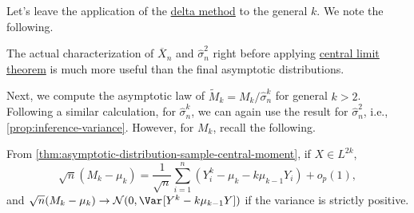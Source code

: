 Let's leave the application of the \hyperref[thm:delta-method]{delta method} to the general \(k\). We note the following.

\begin{note}
	The actual characterization of \(\overline{X} _n\) and \(\hat{\sigma} _n^2\) right before applying \hyperref[thm:CLT]{central limit theorem} is much more useful than the final asymptotic distributions.
\end{note}

Next, we compute the asymptotic law of \(\widetilde{M} _k = M_k / \hat{\sigma} _n^k\) for general \(k > 2\). Following a similar calculation, for \(\hat{\sigma} _n^k\), we can again use the result for \(\hat{\sigma} _n^2\), i.e., \autoref{prop:inference-variance}. However, for \(M_k\), recall the following.

\begin{prev}
	From \autoref{thm:asymptotic-distribution-sample-central-moment}, if \(X \in L^{2k}\),
	\[
		\sqrt{n} (M_k - \mu _k)
		= \frac{1}{\sqrt{n} } \sum_{i=1}^{n} (Y_i^k - \mu _k - k \mu _{k-1} Y_i) + o_p(1),
	\]
	and \(\sqrt{n} (M_k - \mu _k) \to \mathcal{N} (0, \Var_{}[Y^k - k \mu _{k-1} Y] )\) if the variance is strictly positive.
\end{prev}

